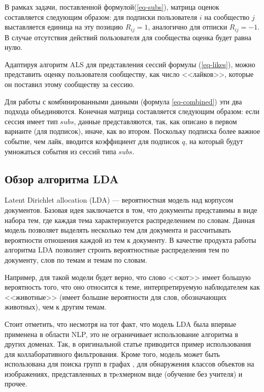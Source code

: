 \documentclass[times,specification,annotation]{itmo-student-thesis}
\begin{document}
В рамках задачи, поставленной формулой(\ref{eq-subs}), матрица оценок составляется следующим образом: для подписки пользователя $i$ на сообщество $j$ выставляется единица на эту позицию $R_{ij} = 1$, аналогично для отписки $R_{ij} = - 1$. В случае отсутствия действий пользователя для сообщества оценка будет равна нулю.

Адаптируя алгоритм ALS \cite{koren2009} для представления сессий формулы (\ref{eq-likes}), можно представить оценку пользователя сообществу, как число <<лайков>>, которые он поставил этому сообществу за сессию.

Для работы с комбинированными данными (формула \ref{eq-combined}) эти два подхода объединяются. Конечная матрица составляется следующим образом: если сессия имеет тип $subs$, данные представляются, так, как описано в первом варианте (для подписок), иначе, как во втором. Поскольку подписка более важное событие, чем лайк, вводится коэффициент для подписок $q$, на который будут умножаться события из сессий типа $subs$.   

\subsection{Обзор алгоритма LDA}\label{sec:lda}

Latent Dirichlet allocation (LDA) \cite{lda2003} --- вероятностная модель над корпусом документов. Базовая идея заключается в том, что документы представимы в виде набора тем, где каждая тема характеризуется распределением по словам. Данная модель позволяет выделять несколько тем для документа и рассчитывать вероятности отношения каждой из тем к документу.
В качестве продукта работы алгоритма LDA позволяет строить вероятностные распределения тем по документу, слов по темам и темам по словам.

Например, для такой модели будет верно, что слово <<кот>> имеет большую вероятность того, что оно относится к теме, интерпретируемую наблюдателем как <<животные>> (имеет большие вероятности для слов, обозначающих животных), чем к другим темам. 

Стоит отметить, что несмотря на тот факт, что модель LDA была впервые применена в области NLP, это не ограничивает использование алгоритма в других доменах. Так, в оригинальной статье \cite{lda2003} приводится пример использования для коллаборативного фильтрования. Кроме того, модель может быть использована для поиска групп в графах \cite{Henderson2009}, для обнаружения классов объектов на изображениях, представленных в трeхмерном виде (обучение без учителя) \cite{Endres2009} и прочее.
\end{document}
